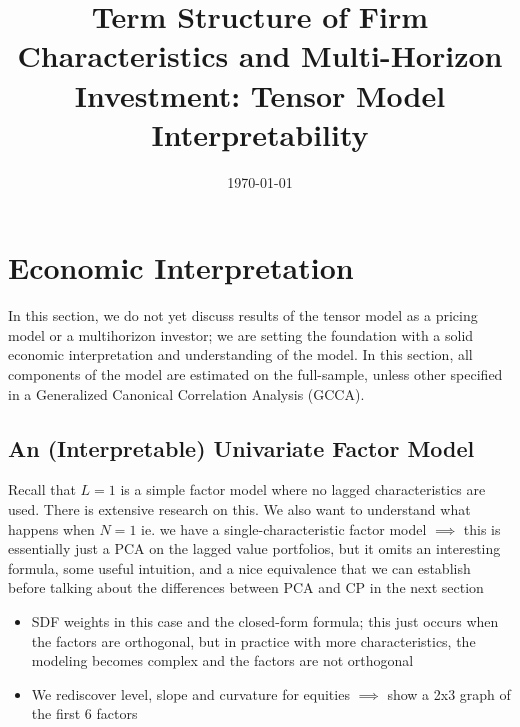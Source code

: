 \documentclass{article}
\title{Term Structure of Firm Characteristics and Multi-Horizon Investment: Tensor Model Interpretability}
\date{\today}
\begin{document}
\maketitle

\tableofcontents

\listoffigures


\newpage

\section{Economic Interpretation}

In this section, we do not yet discuss results of the tensor model as a pricing model or a multihorizon investor; 
we are setting the foundation with a solid economic interpretation and understanding of the model. In this section, all
components of the model are estimated on the full-sample, unless other specified in a Generalized Canonical Correlation Analysis (GCCA). 


\subsection{An (Interpretable) Univariate Factor Model}

Recall that $L = 1$ is a simple factor model where no lagged characteristics are used. There is extensive research on this. 
We also want to understand what happens when $N = 1$ ie. we have a single-characteristic factor model $\implies$
this is essentially just a PCA on the lagged value portfolios, but it omits an interesting formula, some useful intuition, and a nice equivalence 
that we can establish before talking about the differences between PCA and CP in the next section

\begin{itemize}
    \item SDF weights in this case and the closed-form formula; this just occurs when the factors are orthogonal, 
    but in practice with more characteristics, the modeling becomes complex and the factors are not orthogonal
    \item We rediscover level, slope and curvature for equities $\implies$ show a 2x3 graph of the first 6 factors
\end{itemize}
\end{document}
